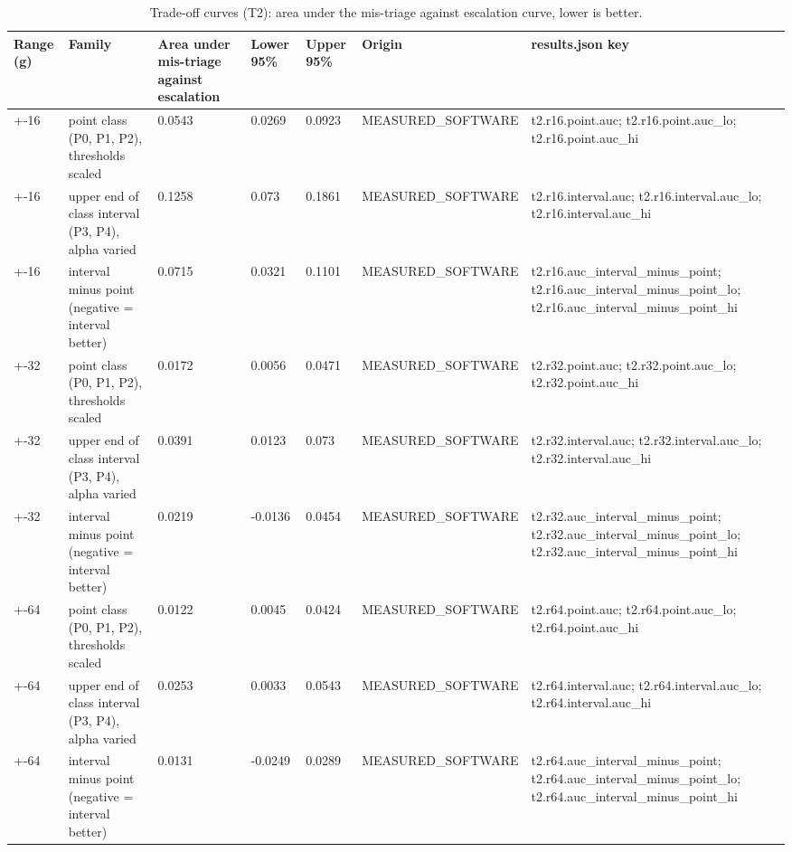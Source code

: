 \begin{table}[t]
\centering
\small
\caption{Trade-off curves (T2): area under the mis-triage against escalation curve, lower is better.}
\label{tab:tab_pareto}
\begin{tabular}{lllllll}
\toprule
Range (g) & Family & Area under mis-triage against escalation & Lower 95\% & Upper 95\% & Origin & results.json key \\
\midrule
+-16 & point class (P0, P1, P2), thresholds scaled & 0.0543 & 0.0269 & 0.0923 & MEASURED\_SOFTWARE & t2.r16.point.auc; t2.r16.point.auc\_lo; t2.r16.point.auc\_hi \\
+-16 & upper end of class interval (P3, P4), alpha varied & 0.1258 & 0.073 & 0.1861 & MEASURED\_SOFTWARE & t2.r16.interval.auc; t2.r16.interval.auc\_lo; t2.r16.interval.auc\_hi \\
+-16 & interval minus point (negative = interval better) & 0.0715 & 0.0321 & 0.1101 & MEASURED\_SOFTWARE & t2.r16.auc\_interval\_minus\_point; t2.r16.auc\_interval\_minus\_point\_lo; t2.r16.auc\_interval\_minus\_point\_hi \\
+-32 & point class (P0, P1, P2), thresholds scaled & 0.0172 & 0.0056 & 0.0471 & MEASURED\_SOFTWARE & t2.r32.point.auc; t2.r32.point.auc\_lo; t2.r32.point.auc\_hi \\
+-32 & upper end of class interval (P3, P4), alpha varied & 0.0391 & 0.0123 & 0.073 & MEASURED\_SOFTWARE & t2.r32.interval.auc; t2.r32.interval.auc\_lo; t2.r32.interval.auc\_hi \\
+-32 & interval minus point (negative = interval better) & 0.0219 & -0.0136 & 0.0454 & MEASURED\_SOFTWARE & t2.r32.auc\_interval\_minus\_point; t2.r32.auc\_interval\_minus\_point\_lo; t2.r32.auc\_interval\_minus\_point\_hi \\
+-64 & point class (P0, P1, P2), thresholds scaled & 0.0122 & 0.0045 & 0.0424 & MEASURED\_SOFTWARE & t2.r64.point.auc; t2.r64.point.auc\_lo; t2.r64.point.auc\_hi \\
+-64 & upper end of class interval (P3, P4), alpha varied & 0.0253 & 0.0033 & 0.0543 & MEASURED\_SOFTWARE & t2.r64.interval.auc; t2.r64.interval.auc\_lo; t2.r64.interval.auc\_hi \\
+-64 & interval minus point (negative = interval better) & 0.0131 & -0.0249 & 0.0289 & MEASURED\_SOFTWARE & t2.r64.auc\_interval\_minus\_point; t2.r64.auc\_interval\_minus\_point\_lo; t2.r64.auc\_interval\_minus\_point\_hi \\
\bottomrule
\end{tabular}
\end{table}

